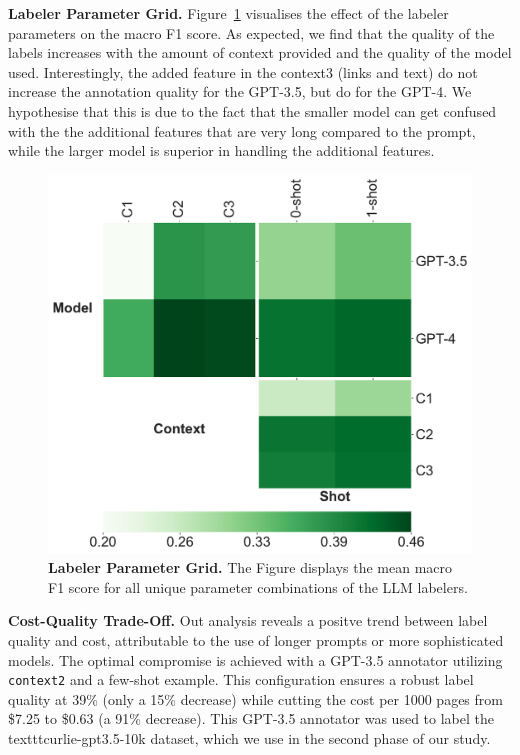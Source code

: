 \textbf{Labeler Parameter Grid.} Figure~\ref{fig:labelers-grid} visualises the effect of the labeler parameters on the macro F1 score. As expected, we find that the quality of the labels increases with the amount of context provided and the quality of the model used. Interestingly, the added feature in the context3 (links and text) do not increase the annotation quality for the GPT-3.5, but do for the GPT-4. We hypothesise that this is due to the fact that the smaller model can get confused with the the additional features that are very long compared to the prompt, while the larger model is superior in handling the additional features.

\begin{figure}[!ht]
    \centering
    \includegraphics[width=.8\columnwidth]{figures/labeler-grid.pdf}
    \caption{\textbf{Labeler Parameter Grid.} The Figure displays the mean macro F1 score for all unique parameter combinations of the LLM labelers.}
    \label{fig:labelers-grid}
\end{figure}

\textbf{Cost-Quality Trade-Off.} 
Out analysis reveals a positve trend between label quality and cost, attributable to the use of longer prompts or more sophisticated models. The optimal compromise is achieved with a GPT-3.5 annotator utilizing \texttt{context2} and a few-shot example. This configuration ensures a robust label quality at 39\% (only a 15\% decrease) while cutting the cost per 1000 pages from \$7.25 to \$0.63 (a 91\% decrease). This GPT-3.5 annotator was used to label the texttt{curlie-gpt3.5-10k} dataset, which we use in the second phase of our study.

